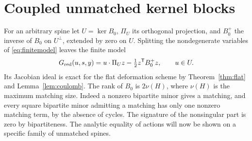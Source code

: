 \section{Coupled unmatched kernel blocks}\label{sec:kernel}

For an arbitrary spine let \(U=\ker B_0\), \(\Pi_U\) its orthogonal projection, and \(B_0^+\) the inverse of \(B_0\) on \(U^\perp\), extended by zero on \(U\). Splitting the nondegenerate variables of \eqref{eq:finitemodel} leaves the finite model
\begin{equation}\label{eq:reduced}
     G_{\rm red}(u,s,y)=u\cdot\Pi_U z-\tfrac12 z^{\mathsf T}B_0^+z,
          \qquad u\in U.
\end{equation}
Its Jacobian ideal is exact for the flat deformation scheme by Theorem~\ref{thm:flat} and Lemma~\ref{lem:coulomb}. The rank of \(B_0\) is \(2\nu(H)\), where \(\nu(H)\) is the maximum matching size. Indeed a nonzero bipartite minor gives a matching, and every square bipartite minor admitting a matching has only one nonzero matching term, by the absence of cycles. The signature of the nonsingular part is zero by bipartiteness. The analytic equality of actions will now be shown on a specific family of unmatched spines.

